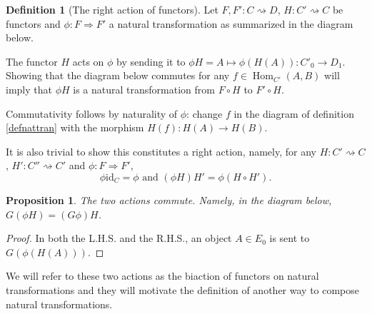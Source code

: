 \documentclass{article}
\newtheorem{prop}[thm]{Proposition}
\theoremstyle{definition}
\newtheorem{defn}[thm]{Definition}
\theoremstyle{remark}
\DeclareMathOperator{\Hom}{Hom}
\newcommand{\id}{\text{id}}
\begin{document}
\begin{defn}[The right action of functors]
	Let $F,F':C\rightsquigarrow D$, $H:C'\rightsquigarrow C$ be functors and $\phi:F\Rightarrow F'$ a natural transformation as summarized in the diagram below.
	\begin{figure}[h]
		\centering
	\end{figure}
	
	The functor $H$ acts on $\phi$ by sending it to $\phi H = A \mapsto \phi(H(A)) : C'_0 \rightarrow D_1$. Showing that the diagram below commutes for any $f \in \Hom_{C'}(A,B)$ will imply that $\phi H$ is a natural transformation from $F\circ H$ to $F'\circ H$.
	\begin{figure}[h]
		\centering
	\end{figure}

	Commutativity follows by naturality of $\phi$: change $f$ in the diagram of definition \ref{defnattran} with the morphism $H(f):H(A) \rightarrow H(B)$.
	
	It is also trivial to show this constitutes a right action, namely, for any $H:C'\rightsquigarrow C$, $H':C''\rightsquigarrow C'$ and $\phi:F\Rightarrow F'$,
	\[\phi \id_C = \phi \text{ and } (\phi H)H' = \phi(H \circ H').\]
\end{defn}

\begin{prop}
	The two actions commute. Namely, in the diagram below, $G(\phi H) = (G\phi) H$.
	\begin{figure}[h]
		\centering
	\end{figure}
\end{prop}
\begin{proof}
In both the L.H.S. and the R.H.S., an object $A \in E_0$ is sent to $G(\phi(H(A)))$.
\end{proof}
We will refer to these two actions as the biaction of functors on natural transformations and they will motivate the definition of another way to compose natural transformations.
\end{document}
